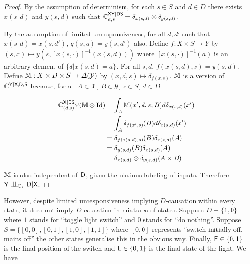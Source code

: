 \begin{proof}
By the assumption of determinism, for each $s\in S$ and $d\in D$ there exists $x(s,d)$ and $y(s,d)$ such that $\mathbb{C}^{\mathsf{X}\mathsf{Y}|\mathsf{D}\mathsf{S}}_{d,s} = \delta_{x(s,d)}\otimes\delta_{y(s,d)}$.

By the assumption of limited unresponsiveness, for all $d,d'$ such that $x(s,d)=x(s,d')$, $y(s,d)=y(s,d')$ also. Define $f:X\times S\to Y$ by $(s,x)\mapsto y(s,[x(s,\cdot)]^{-1}(x(s,d)))$ where $[x(s,\cdot)]^{-1}(a)$ is an arbitrary element of $\{d|x(s,d)=a\}$. For all $s,d$, $f(x(s,d),s)=y(s,d)$. Define $\mathbb{M}:X\times D\times S\to \Delta(\mathcal{Y})$ by $(x,d,s)\mapsto \delta_{f(x,s)}$. $\mathbb{M}$ is a version of $\mathbb{C}^{\mathsf{Y}|\mathsf{X},\mathsf{D},\mathsf{S}}$ because, for all $A\in \mathcal{X}$, $B\in \mathcal{Y}$, $s\in S$, $d\in D$:

\begin{align}
    \kernel{C}^{\RV{X}|\RV{D}\RV{S}}_{(d,s)}\splitter{0.1}(\kernel{M}\otimes\mathrm{Id}) &= \int_A \kernel{M}(x',d,s;B) d\delta_{x(s,d)}(x') \\
                                                                                        &= \int_A \delta_{f(x',s)}(B) d\delta_{x(s,d)}(x') \\
                                                                                        &= \delta_{f(x(s,d),s)}(B)\delta_{x(s,d)}(A) \\
                                                                                        &= \delta_{y(s,d)}(B)\delta_{x(s,d)}(A)\\
                                                                                        &= \delta_{x(s,d)}\otimes\delta_{y(s,d)}(A\times B)
\end{align}

$\mathbb{M}$ is also independent of $\mathsf{D}$, given the obvious labeling of inputs. Therefore $\RV{Y}\CI_{\kernel{C}_s}\RV{D}|\RV{X}$.
\end{proof}

However, despite limited unresponsiveness implying $D$-causation within every state, it does not imply $D$-causation in mixtures of states. Suppose $D=\{1,0\}$ where $1$ stands for ``toggle light switch'' and $0$ stands for ``do nothing''. Suppose $S=\{[0,0],[0,1],[1,0],[1,1]\}$ where $[0,0]$ represents ``switch initially off, mains off'' the other states generalise this in the obvious way. Finally, $\mathsf{F}\in\{0,1\}$ is the final position of the switch and $\mathsf{L}\in\{0,1\}$ is the final state of the light. We have

